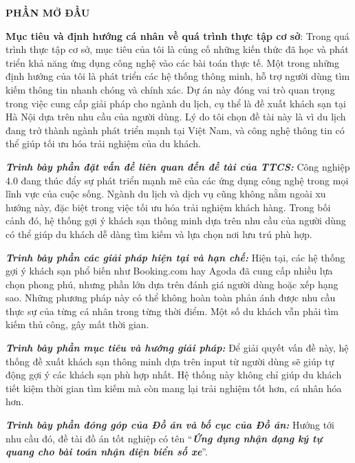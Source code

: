 \begin{center}
    \textbf{\Large PHẦN MỞ ĐẦU}
\end{center}
\textbf{Mục tiêu và định hướng cá nhân về quá trình thực tập cơ sở}: Trong quá trình thực tập cơ sở, mục tiêu của tôi là củng cố những kiến thức đã học và phát triển khả năng ứng dụng công nghệ vào các bài toán thực tế. Một trong những định hướng của tôi là phát triển các hệ thống thông minh, hỗ trợ người dùng tìm kiếm thông tin nhanh chóng và chính xác. Dự án này đóng vai trò quan trọng trong việc cung cấp giải pháp cho ngành du lịch, cụ thể là đề xuất khách sạn tại Hà Nội dựa trên nhu cầu của người dùng. Lý do tôi chọn đề tài này là vì du lịch đang trở thành ngành phát triển mạnh tại Việt Nam, và công nghệ thông tin có thể giúp tối ưu hóa trải nghiệm của du khách.

\textbf{\textit{Trình bày phần đặt vấn đề liên quan đến đề tài của TTCS: }} Công nghiệp 4.0 đang thúc đẩy sự phát triển mạnh mẽ của các ứng dụng công nghệ trong mọi lĩnh vực của cuộc sống. Ngành du lịch và dịch vụ cũng không nằm ngoài xu hướng này, đặc biệt trong việc tối ưu hóa trải nghiệm khách hàng. Trong bối cảnh đó, hệ thống gợi ý khách sạn thông minh dựa trên nhu cầu của người dùng có thể giúp du khách dễ dàng tìm kiếm và lựa chọn nơi lưu trú phù hợp.

\textbf{\textit{Trình bày phần các giải pháp hiện tại và hạn chế: }}  Hiện tại, các hệ thống gợi ý khách sạn phổ biến như Booking.com hay Agoda đã cung cấp nhiều lựa chọn phong phú, nhưng phần lớn dựa trên đánh giá người dùng hoặc xếp hạng sao. Những phương pháp này có thể không hoàn toàn phản ánh được nhu cầu thực sự của từng cá nhân trong từng thời điểm. Một số du khách vẫn phải tìm kiếm thủ công, gây mất thời gian.

\textbf{\textit{Trình bày phần mục tiêu và hướng giải pháp:}}  Để giải quyết vấn đề này, hệ thống đề xuất khách sạn thông minh dựa trên input từ người dùng sẽ giúp tự động gợi ý các khách sạn phù hợp nhất. Hệ thống này không chỉ giúp du khách tiết kiệm thời gian tìm kiếm mà còn mang lại trải nghiệm tốt hơn, cá nhân hóa hơn.

\textbf{\textit{Trình bày phần đóng góp của Đồ án và bố cục của Đồ án:}}  Hướng tới nhu cầu đó, đề tài đồ án tốt nghiệp có tên “\textbf{\textit{Ứng dụng nhận dạng ký tự quang cho bài toán nhận diện biển số xe}}”.

